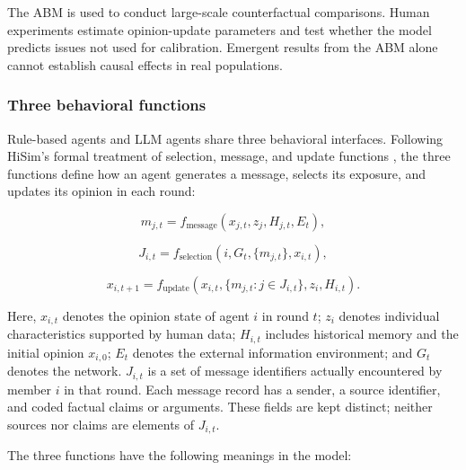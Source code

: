 \documentclass[11pt,a4paper]{article}
\begin{document}
The ABM is used to conduct large-scale counterfactual comparisons. Human experiments estimate opinion-update parameters and test whether the model predicts issues not used for calibration. Emergent results from the ABM alone cannot establish causal effects in real populations.

\subsubsection{Three behavioral functions}

Rule-based agents and LLM agents share three behavioral interfaces. Following HiSim's formal treatment of selection, message, and update functions \cite{mou2024}, the three functions define how an agent generates a message, selects its exposure, and updates its opinion in each round:

\begin{equation*}
m_{j,t}=f_{\text{message}}(x_{j,t},z_j,H_{j,t},E_t),
\end{equation*}

\begin{equation*}
J_{i,t}=f_{\text{selection}}(i,G_t,\{m_{j,t}\},x_{i,t}),
\end{equation*}

\begin{equation*}
x_{i,t+1}=f_{\text{update}}
\left(x_{i,t},\{m_{j,t}:j\in J_{i,t}\},z_i,H_{i,t}\right).
\end{equation*}

Here, $x_{i,t}$ denotes the opinion state of agent $i$ in round $t$; $z_i$ denotes individual characteristics supported by human data; $H_{i,t}$ includes historical memory and the initial opinion $x_{i,0}$; $E_t$ denotes the external information environment; and $G_t$ denotes the network. $J_{i,t}$ is a set of message identifiers actually encountered by member $i$ in that round. Each message record has a sender, a source identifier, and coded factual claims or arguments. These fields are kept distinct; neither sources nor claims are elements of $J_{i,t}$.

The three functions have the following meanings in the model:
\end{document}
